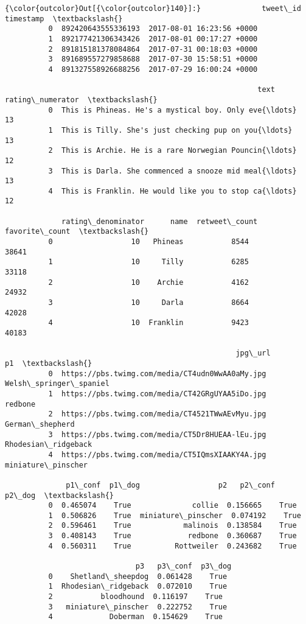 \documentclass[11pt]{article}
\begin{document}
\begin{Verbatim}[commandchars=\\\{\}]
{\color{outcolor}Out[{\color{outcolor}140}]:}              tweet\_id                  timestamp  \textbackslash{}
          0  892420643555336193  2017-08-01 16:23:56 +0000   
          1  892177421306343426  2017-08-01 00:17:27 +0000   
          2  891815181378084864  2017-07-31 00:18:03 +0000   
          3  891689557279858688  2017-07-30 15:58:51 +0000   
          4  891327558926688256  2017-07-29 16:00:24 +0000   
          
                                                          text  rating\_numerator  \textbackslash{}
          0  This is Phineas. He's a mystical boy. Only eve{\ldots}                13   
          1  This is Tilly. She's just checking pup on you{\ldots}                13   
          2  This is Archie. He is a rare Norwegian Pouncin{\ldots}                12   
          3  This is Darla. She commenced a snooze mid meal{\ldots}                13   
          4  This is Franklin. He would like you to stop ca{\ldots}                12   
          
             rating\_denominator      name  retweet\_count  favorite\_count  \textbackslash{}
          0                  10   Phineas           8544           38641   
          1                  10     Tilly           6285           33118   
          2                  10    Archie           4162           24932   
          3                  10     Darla           8664           42028   
          4                  10  Franklin           9423           40183   
          
                                                     jpg\_url                      p1  \textbackslash{}
          0  https://pbs.twimg.com/media/CT4udn0WwAA0aMy.jpg  Welsh\_springer\_spaniel   
          1  https://pbs.twimg.com/media/CT42GRgUYAA5iDo.jpg                 redbone   
          2  https://pbs.twimg.com/media/CT4521TWwAEvMyu.jpg         German\_shepherd   
          3  https://pbs.twimg.com/media/CT5Dr8HUEAA-lEu.jpg     Rhodesian\_ridgeback   
          4  https://pbs.twimg.com/media/CT5IQmsXIAAKY4A.jpg      miniature\_pinscher   
          
              p1\_conf  p1\_dog                  p2   p2\_conf  p2\_dog  \textbackslash{}
          0  0.465074    True              collie  0.156665    True   
          1  0.506826    True  miniature\_pinscher  0.074192    True   
          2  0.596461    True            malinois  0.138584    True   
          3  0.408143    True             redbone  0.360687    True   
          4  0.560311    True          Rottweiler  0.243682    True   
          
                              p3   p3\_conf  p3\_dog  
          0    Shetland\_sheepdog  0.061428    True  
          1  Rhodesian\_ridgeback  0.072010    True  
          2           bloodhound  0.116197    True  
          3   miniature\_pinscher  0.222752    True  
          4             Doberman  0.154629    True  
\end{Verbatim}
            
\end{document}
